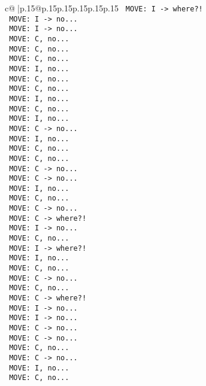\documentclass{article}
\begin{document}
{\begin{supertabular}{c@{$\;$}|p{.15\linewidth}@{}p{.15\linewidth}p{.15\linewidth}p{.15\linewidth}p{.15\linewidth}p{.15\linewidth}}
{{{\texttt{ MOVE: I {-}> where?!} \\
\texttt{ MOVE: I {-}> no...} \\
\texttt{ MOVE: I {-}> no...} \\
\texttt{ MOVE: C, no...} \\
\texttt{ MOVE: C, no...} \\
\texttt{ MOVE: C, no...} \\
\texttt{ MOVE: I, no...} \\
\texttt{ MOVE: C, no...} \\
\texttt{ MOVE: C, no...} \\
\texttt{ MOVE: I, no...} \\
\texttt{ MOVE: C, no...} \\
\texttt{ MOVE: I, no...} \\
\texttt{ MOVE: C {-}> no...} \\
\texttt{ MOVE: I, no...} \\
\texttt{ MOVE: C, no...} \\
\texttt{ MOVE: C, no...} \\
\texttt{ MOVE: C {-}> no...} \\
\texttt{ MOVE: C {-}> no...} \\
\texttt{ MOVE: I, no...} \\
\texttt{ MOVE: C, no...} \\
\texttt{ MOVE: C {-}> no...} \\
\texttt{ MOVE: C {-}> where?!} \\
\texttt{ MOVE: I {-}> no...} \\
\texttt{ MOVE: C, no...} \\
\texttt{ MOVE: I {-}> where?!} \\
\texttt{ MOVE: I, no...} \\
\texttt{ MOVE: C, no...} \\
\texttt{ MOVE: C {-}> no...} \\
\texttt{ MOVE: C, no...} \\
\texttt{ MOVE: C {-}> where?!} \\
\texttt{ MOVE: I {-}> no...} \\
\texttt{ MOVE: I {-}> no...} \\
\texttt{ MOVE: C {-}> no...} \\
\texttt{ MOVE: C {-}> no...} \\
\texttt{ MOVE: C, no...} \\
\texttt{ MOVE: C {-}> no...} \\
\texttt{ MOVE: I, no...} \\
\texttt{ MOVE: C, no...} \\
}}}
\end{supertabular}}
\end{document}
